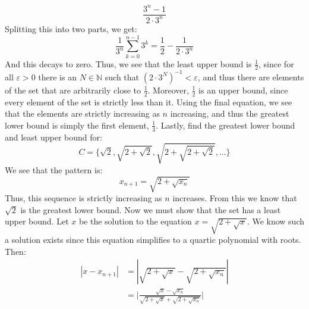 \documentclass[crop=false,class=book,oneside]{standalone}
\begin{document}
\begin{lexample}
\begin{equation}
                    \frac{3^{n}-1}{2\cdot{3}^{n}}
                \end{equation}
                Splitting this into two parts, we get:
                \begin{equation}
                    \frac{1}{3^{n}}\sum_{k=0}^{n-1}3^{k}=
                    \frac{1}{2}-\frac{1}{2\cdot{3}^{n}}
                \end{equation}
                And this decays to zero. Thus, we see that the
                least upper bound is $\frac{1}{2}$, since for all
                $\varepsilon>0$ there is an $N\in\mathbb{N}$ such
                that $(2\cdot{3^{N}})^{\minus{1}}<\varepsilon$,
                and thus there are elements of the set that are
                arbitrarily close to $\frac{1}{2}$. Moreover,
                $\frac{1}{2}$ is an upper bound, since every
                element of the set is strictly less than it.
                Using the final equation, we see that the elements
                are strictly increasing as $n$ increasing, and
                thus the greatest lower bound is simply the
                first element, $\frac{1}{3}$. Lastly, find the
                greatest lower bound and least upper bound for:
                \begin{equation}
                    C=\{\sqrt{2},\sqrt{2+\sqrt{2}},
                        \sqrt{2+\sqrt{2+\sqrt{2}}},\dots\}
                \end{equation}
                We see that the pattern is:
                \begin{equation}
                    x_{n+1}=\sqrt{2+\sqrt{x_{n}}}
                \end{equation}
                Thus, this sequence is strictly increasing as
                $n$ increases. From this we know that
                $\sqrt{2}$ is the greatest lower bound. Now we
                must show that the set has a least upper bound.
                Let $x$ be the solution to the equation
                $x=\sqrt{2+\sqrt{x}}$. We know such a solution
                exists since this equation simplifies to a
                quartic polynomial with roots. Then:
                \begin{align}
                    |x-x_{n+1}|&=
                    |\sqrt{2+\sqrt{x}}-\sqrt{2+\sqrt{x_{n}}}|\\
                    &=\Big|\frac{\sqrt{x}-\sqrt{x_{n}}}
                        {\sqrt{2+\sqrt{x}}+\sqrt{2+\sqrt{x_{n}}}}
                    \Big|\\

\end{align}
\end{lexample}
\end{document}
